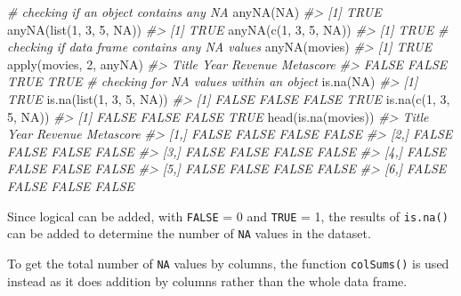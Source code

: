\documentclass[
]{book}
\newenvironment{Shaded}{\begin{snugshade}}{\end{snugshade}}
\newcommand{\CommentTok}[1]{\textcolor[rgb]{0.56,0.35,0.01}{\textit{#1}}}
\newcommand{\ConstantTok}[1]{\textcolor[rgb]{0.00,0.00,0.00}{#1}}
\newcommand{\DecValTok}[1]{\textcolor[rgb]{0.00,0.00,0.81}{#1}}
\newcommand{\FunctionTok}[1]{\textcolor[rgb]{0.00,0.00,0.00}{#1}}
\newcommand{\NormalTok}[1]{#1}
\begin{document}
\begin{Shaded}
\begin{Highlighting}[]
\CommentTok{\# checking if an object contains any NA}
\FunctionTok{anyNA}\NormalTok{(}\ConstantTok{NA}\NormalTok{)}
\CommentTok{\#\textgreater{} [1] TRUE}
\FunctionTok{anyNA}\NormalTok{(}\FunctionTok{list}\NormalTok{(}\DecValTok{1}\NormalTok{, }\DecValTok{3}\NormalTok{, }\DecValTok{5}\NormalTok{, }\ConstantTok{NA}\NormalTok{))}
\CommentTok{\#\textgreater{} [1] TRUE}
\FunctionTok{anyNA}\NormalTok{(}\FunctionTok{c}\NormalTok{(}\DecValTok{1}\NormalTok{, }\DecValTok{3}\NormalTok{, }\DecValTok{5}\NormalTok{, }\ConstantTok{NA}\NormalTok{))}
\CommentTok{\#\textgreater{} [1] TRUE}
\CommentTok{\# checking if data frame contains any NA values}
\FunctionTok{anyNA}\NormalTok{(movies)}
\CommentTok{\#\textgreater{} [1] TRUE}
\FunctionTok{apply}\NormalTok{(movies, }\DecValTok{2}\NormalTok{, anyNA)}
\CommentTok{\#\textgreater{}     Title      Year   Revenue Metascore }
\CommentTok{\#\textgreater{}     FALSE     FALSE      TRUE      TRUE}
\CommentTok{\# checking for NA values within an object}
\FunctionTok{is.na}\NormalTok{(}\ConstantTok{NA}\NormalTok{)}
\CommentTok{\#\textgreater{} [1] TRUE}
\FunctionTok{is.na}\NormalTok{(}\FunctionTok{list}\NormalTok{(}\DecValTok{1}\NormalTok{, }\DecValTok{3}\NormalTok{, }\DecValTok{5}\NormalTok{, }\ConstantTok{NA}\NormalTok{))}
\CommentTok{\#\textgreater{} [1] FALSE FALSE FALSE  TRUE}
\FunctionTok{is.na}\NormalTok{(}\FunctionTok{c}\NormalTok{(}\DecValTok{1}\NormalTok{, }\DecValTok{3}\NormalTok{, }\DecValTok{5}\NormalTok{, }\ConstantTok{NA}\NormalTok{))}
\CommentTok{\#\textgreater{} [1] FALSE FALSE FALSE  TRUE}
\FunctionTok{head}\NormalTok{(}\FunctionTok{is.na}\NormalTok{(movies))}
\CommentTok{\#\textgreater{}      Title  Year Revenue Metascore}
\CommentTok{\#\textgreater{} [1,] FALSE FALSE   FALSE     FALSE}
\CommentTok{\#\textgreater{} [2,] FALSE FALSE   FALSE     FALSE}
\CommentTok{\#\textgreater{} [3,] FALSE FALSE   FALSE     FALSE}
\CommentTok{\#\textgreater{} [4,] FALSE FALSE   FALSE     FALSE}
\CommentTok{\#\textgreater{} [5,] FALSE FALSE   FALSE     FALSE}
\CommentTok{\#\textgreater{} [6,] FALSE FALSE   FALSE     FALSE}
\end{Highlighting}
\end{Shaded}

Since logical can be added, with \texttt{FALSE} = 0 and \texttt{TRUE} = 1, the results of \texttt{is.na()} can be added to determine the number of \texttt{NA} values in the dataset.

To get the total number of \texttt{NA} values by columns, the function \texttt{colSums()} is used instead as it does addition by columns rather than the whole data frame.
\end{document}
